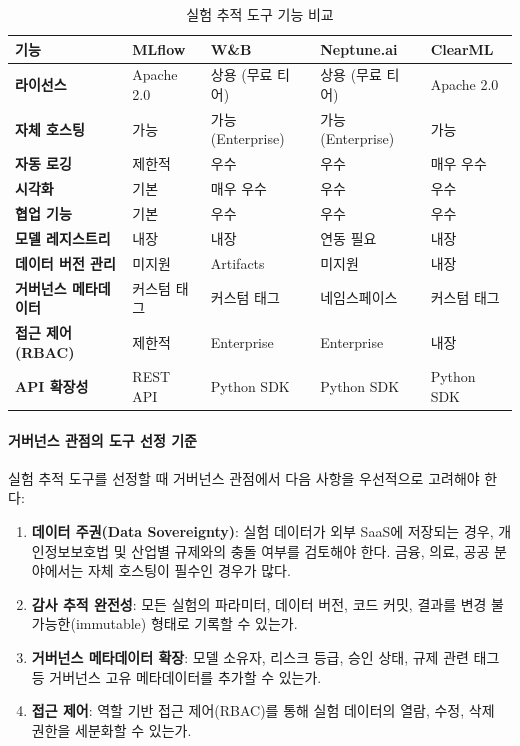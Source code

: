 \begin{table}[htbp]
\centering
\caption{실험 추적 도구 기능 비교}
\label{tab:14_experiment_tools}
\begin{tabularx}{\textwidth}{lXXXX}
\toprule
\textbf{기능} & \textbf{MLflow} & \textbf{W\&B} & \textbf{Neptune.ai} & \textbf{ClearML} \\
\midrule
\textbf{라이선스} & Apache 2.0 & 상용 (무료 티어) & 상용 (무료 티어) & Apache 2.0 \\
\textbf{자체 호스팅} & 가능 & 가능 (Enterprise) & 가능 (Enterprise) & 가능 \\
\textbf{자동 로깅} & 제한적 & 우수 & 우수 & 매우 우수 \\
\textbf{시각화} & 기본 & 매우 우수 & 우수 & 우수 \\
\textbf{협업 기능} & 기본 & 우수 & 우수 & 우수 \\
\textbf{모델 레지스트리} & 내장 & 내장 & 연동 필요 & 내장 \\
\textbf{데이터 버전 관리} & 미지원 & Artifacts & 미지원 & 내장 \\
\textbf{거버넌스 메타데이터} & 커스텀 태그 & 커스텀 태그 & 네임스페이스 & 커스텀 태그 \\
\textbf{접근 제어(RBAC)} & 제한적 & Enterprise & Enterprise & 내장 \\
\textbf{API 확장성} & REST API & Python SDK & Python SDK & Python SDK \\
\bottomrule
\end{tabularx}
\end{table}

\paragraph{거버넌스 관점의 도구 선정 기준}

실험 추적 도구를 선정할 때 거버넌스 관점에서 다음 사항을 우선적으로 고려해야 한다:

\begin{enumerate}
    \item \textbf{데이터 주권(Data Sovereignty)}: 실험 데이터가 외부 SaaS에 저장되는 경우, 개인정보보호법 및 산업별 규제와의 충돌 여부를 검토해야 한다. 금융, 의료, 공공 분야에서는 자체 호스팅이 필수인 경우가 많다.
    \item \textbf{감사 추적 완전성}: 모든 실험의 파라미터, 데이터 버전, 코드 커밋, 결과를 변경 불가능한(immutable) 형태로 기록할 수 있는가.
    \item \textbf{거버넌스 메타데이터 확장}: 모델 소유자, 리스크 등급, 승인 상태, 규제 관련 태그 등 거버넌스 고유 메타데이터를 추가할 수 있는가.
    \item \textbf{접근 제어}: 역할 기반 접근 제어(RBAC)를 통해 실험 데이터의 열람, 수정, 삭제 권한을 세분화할 수 있는가.
\end{enumerate}

